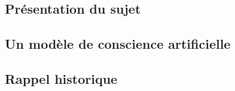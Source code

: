 \subsection{Présentation du sujet}


\subsection{Un modèle de conscience artificielle}


\subsection{Rappel historique}



